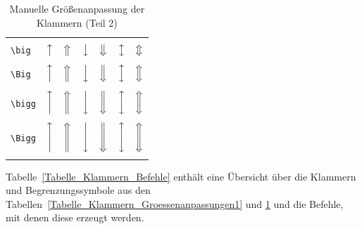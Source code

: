 \documentclass[a4paper,10pt,twoside]{scrbook}
\begin{document}
{\begin{table}[h!tb]
\centering
\caption{Manuelle Größenanpassung der Klammern (Teil 2)}
\label{Tabelle_Klammern_Groessenanpassungen2}       %
\begin{tabular}{lcccccc}
\hline
& & & & & &   \\
\texttt{\textbackslash big} & $\big\uparrow$ & $\big\Uparrow$ &  
$\big\downarrow$ & $\big\Downarrow$ & $\big\updownarrow$ & $\big\Updownarrow$  \\
& & & & & &   \\
\texttt{\textbackslash Big} & $\Big\uparrow$ & $\Big\Uparrow$ &  
$\Big\downarrow$ & $\Big\Downarrow$ & $\Big\updownarrow$ & $\Big\Updownarrow$  \\
& & & & & &   \\
\texttt{\textbackslash bigg} & $\bigg\uparrow$ & $\bigg\Uparrow$ &  
$\bigg\downarrow$ & $\bigg\Downarrow$ & $\bigg\updownarrow$ & $\bigg\Updownarrow$ \\
& & & & & &   \\
\texttt{\textbackslash Bigg} & $\Bigg\uparrow$ & $\Bigg\Uparrow$ &  
$\Bigg\downarrow$ & $\Bigg\Downarrow$ & $\Bigg\updownarrow$ & $\Bigg\Updownarrow$ \\
& & & & & &   \\
\hline
\end{tabular}
\end{table}

Tabelle~\ref{Tabelle_Klammern_Befehle} enthält eine Übersicht über die 
Klammern und Begrenzungssymbole aus den Tabellen~\ref{Tabelle_Klammern_Groessenanpassungen1} und \ref{Tabelle_Klammern_Groessenanpassungen2} und die Befehle, mit denen diese erzeugt werden.


}
\end{document}
